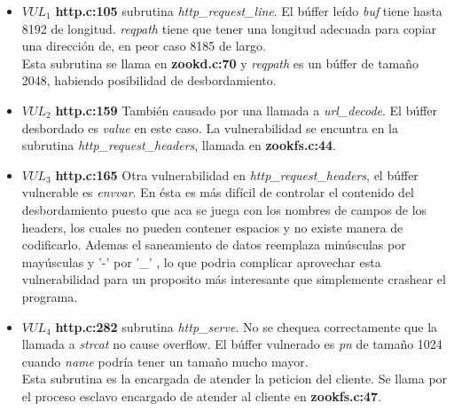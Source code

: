 \documentclass[12pt]{article}
\begin{document}
\begin{itemize}
\item  $VUL_1$ \textbf{ \lbrack http.c:105\rbrack } subrutina \textit{http\_request\_line}.
El búffer leído \textit{buf} tiene hasta 8192 de longitud. \textit{reqpath} tiene que tener una longitud adecuada para copiar una dirección de, en peor caso 8185 de largo. \\
Esta subrutina se llama en \textbf{ \lbrack zookd.c:70\rbrack } y \textit{reqpath} es un búffer de tamaño 2048, habiendo posibilidad de desbordamiento.

\item  $VUL_2$ \textbf{ \lbrack http.c:159\rbrack } También causado por una llamada a \textit{url\_decode}. El búffer desbordado es \textit{value} en este caso. La vulnerabilidad se encuntra en la subrutina \textit{http\_request\_headers}, llamada en \textbf{ \lbrack zookfs.c:44\rbrack }.

\item  $VUL_3$ \textbf{ \lbrack http.c:165\rbrack } Otra vulnerabilidad en \textit{http\_request\_headers}, el búffer vulnerable es \textit{envvar}. En ésta es más difícil de controlar el contenido del desbordamiento puesto que aca se juega con los nombres de campos de los headers, los cuales no pueden contener espacios y no existe manera de codificarlo. Ademas el saneamiento de datos reemplaza minúsculas por mayúsculas y '-' por '\_' , lo que podria complicar aprovechar esta vulnerabilidad para un proposito más interesante que simplemente crashear el programa.

\item  $VUL_4$ \textbf{ \lbrack http.c:282\rbrack } subrutina \textit{http\_serve}. No se chequea correctamente que la llamada a \textit{strcat} no cause overflow. El búffer vulnerado es \textit{pn} de tamaño 1024 cuando \textit{name} podría tener un tamaño mucho mayor.\\
Esta subrutina es la encargada de atender la peticion del cliente. Se llama por el proceso esclavo encargado de atender al cliente en \textbf{ \lbrack zookfs.c:47\rbrack }.
 

\end{itemize}
\end{document}
